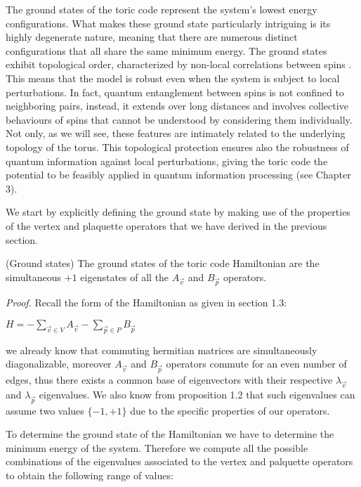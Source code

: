 \documentclass{Configuration_Files/PoliMi3i_thesis}
\begin{document}
The ground states of the toric code represent the system's lowest energy configurations. What makes these ground state particularly intriguing is its highly degenerate nature, meaning that there are numerous distinct configurations that all share the same minimum energy. 
The ground states exhibit topological order, characterized by non-local correlations between spins \cite{Kit02}. This means that the model is robust  even when the system is subject to local perturbations.  In fact, quantum entanglement between spins is not confined to neighboring pairs, instead, it extends over long distances and involves collective behaviours of spins that cannot be understood by considering them individually.
Not only, as we will see, these features are intimately related to the underlying topology of the torus. This topological protection ensures also the robustness of quantum information against local perturbations, giving the toric code the potential to be feasibly applied in quantum information processing (see Chapter 3).\newline

We start by explicitly defining the ground state by making use of the properties of the vertex and plaquette operators that we have derived in the previous section.

\begin{proposition} (Ground states) The ground states of the toric code Hamiltonian are the simultaneous $+1$ eigenstates of all the $A_{\vec{v}}$ and $B_{\vec{p}}$ operators. 
\end{proposition}

\textit{Proof.}\newline 
Recall the form of the Hamiltonian as given in section 1.3:

\begin{center}
	
	$H = -\sum_{\vec{v} \in V}
	A_{\vec{v}} - \sum_{\vec{p} \in P} B_{\vec{p}} $
	
\end{center}

we already know that commuting hermitian matrices are simultaneously diagonalizable, moreover $A_{\vec{v}} $ and $B_{\vec{p}} $ operators commute for an even number of edges, thus there exists a common base of eigenvectors with their respective $\lambda_{\vec{v}}$ and $\lambda_{\vec{p}}$ eigenvalues. We also know from proposition 1.2 that such eigenvalues can assume two values $\{-1,+1\}$ due to the specific properties of our operators.

To determine the ground state of the Hamiltonian we have to determine the minimum energy of the system. Therefore we compute all the possible combinations of the eigenvalues associated to the vertex and palquette operators to obtain the following range of values:
\end{document}
